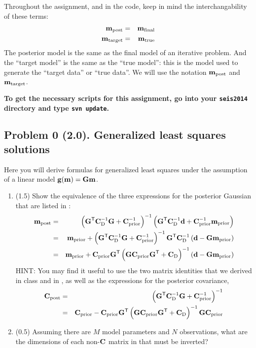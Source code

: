 \documentclass[11pt,titlepage,fleqn]{article}
\begin{document}
Throughout the assignment, and in the code, keep in mind the interchangability of these terms:
%
\begin{eqnarray*}
\mbox{${\bf m}$}_{\rm post} &=& \mbox{${\bf m}$}_{\rm final}
\\
\mbox{${\bf m}$}_{\rm target} &=& \mbox{${\bf m}$}_{\rm true}
\end{eqnarray*}
%
The posterior model is the same as the final model of an iterative problem. And the ``target model'' is the same as the ``true model'': this is the model used to generate the ``target data'' or ``true data''. We will use the notation $\mbox{${\bf m}$}_{\rm post}$ and $\mbox{${\bf m}$}_{\rm target}$.

\bigskip\noindent
{\bf To get the necessary scripts for this assignment, go into your {\tt seis2014} directory and type {\tt svn update}.}


\pagebreak
\subsection*{Problem 0 (2.0). Generalized least squares solutions}

Here you will derive formulas for generalized least squares under the assumption of a linear model $\mbox{${\bf g}$}(\mbox{${\bf m}$}) = \mbox{${\bf G}$}\mbox{${\bf m}$}$.
%
\begin{enumerate}
\item (1.5) Show the equivalence of the three expressions for the posterior Gaussian that are listed in \citet[][p.~66]{Tarantola2005}:
%
\begin{eqnarray}
\mbox{${\bf m}$}_{\rm post} &=& \left(\mbox{${\bf G}$}^{\mathsf{T}} \mbox{${\bf C}$}_{\rm D}^{-1} \mbox{${\bf G}$} + \mbox{${\bf C}$}_{\rm prior}^{-1} \right)^{-1}
\left( \mbox{${\bf G}$}^{\mathsf{T}} \mbox{${\bf C}$}_{\rm D}^{-1} \mbox{${\bf d}$} + \mbox{${\bf C}$}_{\rm prior}^{-1}\mbox{${\bf m}$}_{\rm prior} \right)
\label{mpost1}
\\
&=& \mbox{${\bf m}$}_{\rm prior} + \left(\mbox{${\bf G}$}^{\mathsf{T}} \mbox{${\bf C}$}_{\rm D}^{-1} \mbox{${\bf G}$} + \mbox{${\bf C}$}_{\rm prior}^{-1} \right)^{-1} \mbox{${\bf G}$}^{\mathsf{T}} \mbox{${\bf C}$}_{\rm D}^{-1} \left( \mbox{${\bf d}$} - \mbox{${\bf G}$} \mbox{${\bf m}$}_{\rm prior}\right)
\label{mpost2}
\\
&=& \mbox{${\bf m}$}_{\rm prior} + \mbox{${\bf C}$}_{\rm prior} \mbox{${\bf G}$}^{\mathsf{T}} \left( \mbox{${\bf G}$} \mbox{${\bf C}$}_{\rm prior} \mbox{${\bf G}$}^{\mathsf{T}} + \mbox{${\bf C}$}_{\rm D}\right)^{-1} \left( \mbox{${\bf d}$} - \mbox{${\bf G}$} \mbox{${\bf m}$}_{\rm prior}\right)
\label{mpost3}
\end{eqnarray}
%
HINT: You may find it useful to use the two matrix identities that we derived in class and in \citet[][Eq.~6.525]{Tarantola2005}, as well as the expressions for the posterior covariance,
%
\begin{eqnarray}
\mbox{${\bf C}$}_{\rm post} &=& \left(\mbox{${\bf G}$}^{\mathsf{T}} \mbox{${\bf C}$}_{\rm D}^{-1} \mbox{${\bf G}$} + \mbox{${\bf C}$}_{\rm prior}^{-1} \right)^{-1}
\label{cpost1}
\\
&=& \mbox{${\bf C}$}_{\rm prior} - \mbox{${\bf C}$}_{\rm prior} \mbox{${\bf G}$}^{\mathsf{T}} \left( \mbox{${\bf G}$} \mbox{${\bf C}$}_{\rm prior} \mbox{${\bf G}$}^{\mathsf{T}} + \mbox{${\bf C}$}_{\rm D} \right)^{-1} \mbox{${\bf G}$} \mbox{${\bf C}$}_{\rm prior}
\label{cpost2}
\end{eqnarray}

\item (0.5) Assuming there are $M$ model parameters and $N$ observations, what are the dimensions of each non-$\mbox{${\bf C}$}$ matrix in  that must be inverted?
\end{enumerate}
\end{document}
